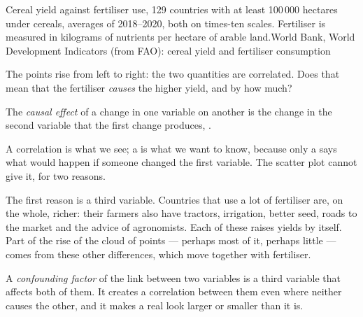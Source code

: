 \begin{omchart}{Cereal yield against fertiliser use, 129 countries with at least 100\,000 hectares
under cereals, averages of 2018--2020, both on times-ten scales. Fertiliser is measured in kilograms
of nutrients per hectare of arable land.}{World Bank, World Development Indicators (from FAO): cereal yield and fertiliser consumption}
\end{omchart}

The points rise from left to right: the two quantities are correlated. Does that mean that the
fertiliser \emph{causes} the higher yield, and by how much?

\begin{definition}\label{def:g10:economic-models:causal-effect}
The \emph{causal effect} of a change in one variable on another is the change
in the second variable that the first change produces, .
\end{definition}

A correlation is what we see; a  is what we want to know, because only a 
says what would happen if someone changed the first variable. The scatter plot cannot give it, for
two reasons.

The first reason is a third variable. Countries that use a lot of fertiliser are, on the whole,
richer: their farmers also have tractors, irrigation, better seed, roads to the market and the
advice of agronomists. Each of these raises yields by itself. Part of the rise of the cloud of
points --- perhaps most of it, perhaps little --- comes from these other differences, which move
together with fertiliser.

\begin{definition}\label{def:g10:economic-models:confounder}
A \emph{confounding factor} of the link between two variables is a third
variable that affects both of them. It creates a correlation between them even where neither causes
the other, and it makes a real  look larger or smaller than it is.
\end{definition}

